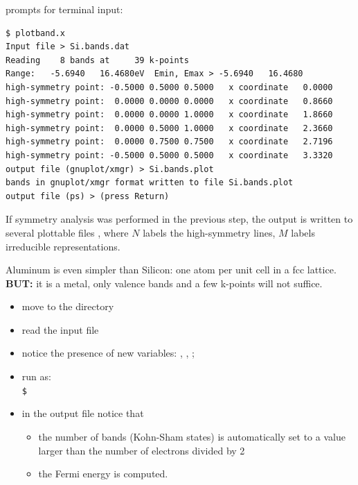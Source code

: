 \documentclass[landscape]{foils}
\def\indent{\hspace*{1cm}}
\def\prompt{\texttt{\$~}}
\def\exec#1{\indent\prompt\code{#1}}
\begin{document}
 prompts for terminal input:
{\codecolor
\begin{verbatim}
$ plotband.x 
Input file > Si.bands.dat
Reading    8 bands at     39 k-points
Range:   -5.6940   16.4680eV  Emin, Emax > -5.6940   16.4680
high-symmetry point: -0.5000 0.5000 0.5000   x coordinate   0.0000
high-symmetry point:  0.0000 0.0000 0.0000   x coordinate   0.8660
high-symmetry point:  0.0000 0.0000 1.0000   x coordinate   1.8660
high-symmetry point:  0.0000 0.5000 1.0000   x coordinate   2.3660
high-symmetry point:  0.0000 0.7500 0.7500   x coordinate   2.7196
high-symmetry point: -0.5000 0.5000 0.5000   x coordinate   3.3320
output file (gnuplot/xmgr) > Si.bands.plot   
bands in gnuplot/xmgr format written to file Si.bands.plot
output file (ps) > (press Return)
\end{verbatim}
}
%
If symmetry analysis was performed in the previous step, the output is
written to several plottable files ,
where $N$ labels the high-symmetry lines,
$M$ labels irreducible representations.


%
Aluminum is even simpler than Silicon: one atom per unit cell
in a fcc lattice.\\
{\bf BUT:} it is a metal, only valence bands and a few k-points will
not suffice.
\begin{itemize}
\item move to the  directory
\item read the  input file 
\item notice the presence of new variables: ,
, ;
\item run  as:\\[0.5em]
  \exec{pw.x -in pw.al.scf.in > pw.al.scf.out}
\item in the output file notice that
  \begin{itemize}
  \item the number of bands (Kohn-Sham states)
    is automatically set to a value larger than the number of
    electrons divided by 2
  \item the Fermi energy is computed.
  \end{itemize}
\end{itemize}
\end{document}
